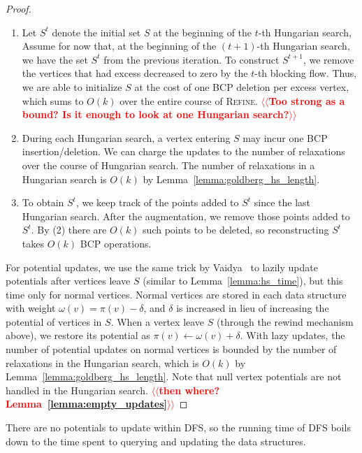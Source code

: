 \documentclass[a4paper,UKenglish]{socg-lipics-v2018}
\makeatletter
\def\note#1{\textcolor{red}{{#1}}}
\def\fsupply{\phi}
\theoremstyle{plain}
\numberwithin{figure}{section}
\def\n@te#1{\textsf{\boldmath \textbf{$\langle\!\langle$#1$\rangle\!\rangle$}}\leavevmode}
\def\note#1{\textcolor{red}{\n@te{#1}}}
\makeatother
\begin{document}
\begin{toappendix}
\begin{proof}
\begin{enumerate}
\item Let $S^t$ denote the initial set $S$ at the beginning of the $t$-th Hungarian search,
Assume for now that, at the beginning of the $(t+1)$-th Hungarian search, we have the set $S^t$ from the previous iteration.
To construct $S^{t+1}$, we remove the vertices that had excess decreased to zero by the $t$-th blocking flow.
Thus, we are able to initialize $S$ at the cost of one BCP deletion per excess vertex, which sums to $O(k)$ over the entire course of \textsc{Refine}.  \note{Too strong as a bound? Is it enough to look at one Hungarian search?}

\item During each Hungarian search, a vertex entering $S$ may incur one BCP insertion/deletion.
We can charge the updates to the number of relaxations over the course of Hungarian search.
The number of relaxations in a Hungarian search is $O(k)$ by Lemma~\ref{lemma:goldberg_hs_length}.

\item To obtain $S^t$, we keep track of the points added to $S^t$ since the last Hungarian search.  After the augmentation, we remove those points added to $S^t$.  By (2) there are $O(k)$ such points to be deleted, so reconstructing $S^t$ takes $O(k)$ BCP operations.
\end{enumerate}

For potential updates, we use the same trick by Vaidya~\cite{Vaidya89} to
lazily update potentials after vertices leave $S$ (similar to Lemma~\ref{lemma:hs_time}), but this time only for normal vertices.
Normal vertices are stored in each data structure with weight
$\omega(v) = \pi(v) - \delta$, and $\delta$ is increased in lieu of increasing
the potential of vertices in $S$.
When a vertex leave $S$ (through the rewind mechanism above), we restore
its potential as $\pi(v) \gets \omega(v) + \delta$.
With lazy updates, the number of potential updates on normal vertices is
bounded by the number of relaxations in the Hungarian search, which is $O(k)$ by Lemma~\ref{lemma:goldberg_hs_length}.
Note that null vertex potentials are not handled in the Hungarian search. \note{then where? Lemma~\ref{lemma:empty_updates}}
\end{proof}


There are no potentials to update within \textsc{DFS}, so the running time of
\textsc{DFS} boils down to the time spent to querying and updating the data
structures.


\end{toappendix}
\end{document}
